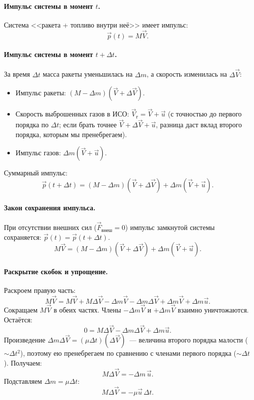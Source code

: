 \documentclass[12pt]{article}
\begin{document}
\paragraph{Импульс системы в момент $t$.}
Система <<ракета + топливо внутри неё>> имеет импульс:
\[
	\vec{p}(t) = M\vec{V}.
\]

\paragraph{Импульс системы в момент $t + \Delta t$.}
За время $\Delta t$ масса ракеты уменьшилась на $\Delta m$, а скорость изменилась на $\Delta\vec{V}$:
\begin{itemize}
	\item Импульс ракеты: $(M - \Delta m)(\vec{V} + \Delta\vec{V})$.
	\item Скорость выброшенных газов в ИСО: $\vec{V}_{\text{г}} = \vec{V} + \vec{u}$ (с точностью до первого порядка по $\Delta t$; если брать точнее $\vec{V} + \Delta\vec{V} + \vec{u}$, разница даст вклад второго порядка, которым мы пренебрегаем).
	\item Импульс газов: $\Delta m (\vec{V} + \vec{u})$.
\end{itemize}
Суммарный импульс:
\[
	\vec{p}(t+\Delta t) = (M - \Delta m)(\vec{V} + \Delta\vec{V}) + \Delta m (\vec{V} + \vec{u}).
\]

\paragraph{Закон сохранения импульса.}
При отсутствии внешних сил ($\vec{F}_{\text{внеш}} = 0$) импульс замкнутой системы сохраняется: $\vec{p}(t) = \vec{p}(t+\Delta t)$.
\[
	M\vec{V} = (M - \Delta m)(\vec{V} + \Delta\vec{V}) + \Delta m (\vec{V} + \vec{u}).
\]

\paragraph{Раскрытие скобок и упрощение.}
Раскроем правую часть:
\[
	M\vec{V} = M\vec{V} + M\Delta\vec{V} - \Delta m\vec{V} - \Delta m\Delta\vec{V} + \Delta m\vec{V} + \Delta m\vec{u}.
\]
Сокращаем $M\vec{V}$ в обеих частях. Члены $-\Delta m\vec{V}$ и $+\Delta m\vec{V}$ взаимно уничтожаются. Остаётся:
\[
	0 = M\Delta\vec{V} - \Delta m\Delta\vec{V} + \Delta m\vec{u}.
\]
Произведение $\Delta m\Delta\vec{V} = (\mu\Delta t)(\Delta\vec{V})$~--- величина второго порядка малости ($\sim \Delta t^2$), поэтому ею пренебрегаем по сравнению с членами первого порядка ($\sim \Delta t$). Получаем:
\[
	M\Delta\vec{V} = -\Delta m\,\vec{u}.
\]
Подставляем $\Delta m = \mu\Delta t$:
\[
	M\Delta\vec{V} = -\mu\vec{u}\,\Delta t.
\]
\end{document}
